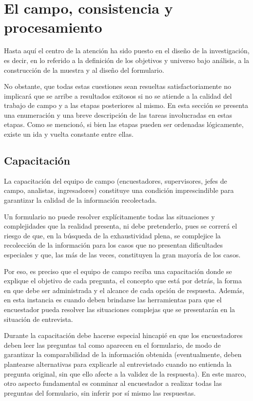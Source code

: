 \documentclass[
]{book}
\begin{document}
\hypertarget{el-campo-consistencia-y-procesamiento}{%
\section{El campo, consistencia y procesamiento}\label{el-campo-consistencia-y-procesamiento}}

Hasta aquí el centro de la atención ha sido puesto en el diseño de la investigación, es decir, en lo referido a la definición de los objetivos y universo bajo análisis, a la construcción de la muestra y al diseño del formulario.

No obstante, que todas estas cuestiones sean resueltas satisfactoriamente no implicará que se arribe a resultados exitosos si no se atiende a la calidad del trabajo de campo y a las etapas posteriores al mismo. En esta sección se presenta una enumeración y una breve descripción de las tareas involucradas en estas etapas. Como se mencionó, si bien las etapas pueden ser ordenadas lógicamente, existe un ida y vuelta constante entre ellas.

\hypertarget{capacitaciuxf3n}{%
\subsection{Capacitación}\label{capacitaciuxf3n}}

La capacitación del equipo de campo (encuestadores, supervisores, jefes de campo, analistas, ingresadores) constituye una condición imprescindible para garantizar la calidad de la información recolectada.

\hfill\break
Un formulario no puede resolver explícitamente todas las situaciones y complejidades que la realidad presenta, ni debe pretenderlo, pues se correrá el riesgo de que, en la búsqueda de la exhaustividad plena, se complejice la recolección de la información para los casos que no presentan dificultades especiales y que, las más de las veces, constituyen la gran mayoría de los casos.

Por eso, es preciso que el equipo de campo reciba una capacitación donde se explique el objetivo de cada pregunta, el concepto que está por detrás, la forma en que debe ser administrada y el alcance de cada opción de respuesta. Además, en esta instancia es cuando deben brindarse las herramientas para que el encuestador pueda resolver las situaciones complejas que se presentarán en la situación de entrevista.

Durante la capacitación debe hacerse especial hincapié en que los encuestadores deben leer las preguntas tal como aparecen en el formulario, de modo de garantizar la comparabilidad de la información obtenida (eventualmente, deben plantearse alternativas para explicarle al entrevistado cuando no entienda la pregunta original, sin que ello afecte a la validez de la respuesta). En este marco, otro aspecto fundamental es conminar al encuestador a realizar todas las preguntas del formulario, sin inferir por sí mismo las respuestas.
\end{document}
